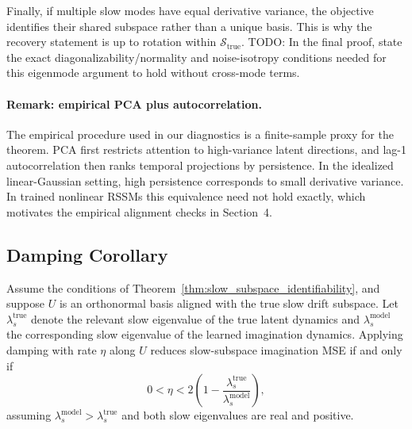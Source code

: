 Finally, if multiple slow modes have equal derivative variance, the objective
identifies their shared subspace rather than a unique basis. This is why the
recovery statement is up to rotation within $\mathcal{S}_{\mathrm{true}}$.
TODO: In the final proof, state the exact diagonalizability/normality and
noise-isotropy conditions needed for this eigenmode argument to hold without
cross-mode terms.

\paragraph{Remark: empirical PCA plus autocorrelation.}
The empirical procedure used in our diagnostics is a finite-sample proxy for
the theorem. PCA first restricts attention to high-variance latent directions,
and lag-1 autocorrelation then ranks temporal projections by persistence. In
the idealized linear-Gaussian setting, high persistence corresponds to small
derivative variance. In trained nonlinear RSSMs this equivalence need not hold
exactly, which motivates the empirical alignment checks in Section~4.

\subsection{Damping Corollary}

\begin{corollary}
\label{cor:damping}
Assume the conditions of Theorem~\ref{thm:slow_subspace_identifiability}, and
suppose $U$ is an orthonormal basis aligned with the true slow drift subspace.
Let $\lambda_s^{\mathrm{true}}$ denote the relevant slow eigenvalue of the true
latent dynamics and $\lambda_s^{\mathrm{model}}$ the corresponding slow
eigenvalue of the learned imagination dynamics. Applying damping with rate
$\eta$ along $U$ reduces slow-subspace imagination MSE if and only if
\begin{equation}
    0 < \eta
    <
    2\left(1 -
    \frac{\lambda_s^{\mathrm{true}}}{\lambda_s^{\mathrm{model}}}
    \right),
    \label{eq:damping_bound}
\end{equation}
assuming $\lambda_s^{\mathrm{model}}>\lambda_s^{\mathrm{true}}$ and both slow
eigenvalues are real and positive.
\end{corollary}

